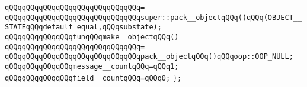 \verb|qQQqqQQqqQQqqQQqqQQqqQQqqQQqqQQq=|\newline
\verb|qQQqqQQqqQQqqQQqqQQqqQQqqQQqqQQqsuper::pack__objectqQQq()qQQq(OBJECT__STATEqQQqdefault_equal,qQQqsubstate);|\newline
\newline
\verb|qQQqqQQqqQQqqQQqfunqQQqmake__objectqQQq()|\newline
\verb|qQQqqQQqqQQqqQQqqQQqqQQqqQQqqQQq=|\newline
\verb|qQQqqQQqqQQqqQQqqQQqqQQqqQQqqQQqpack__objectqQQq()qQQqoop::OOP_NULL;|\newline
\newline
\newline
\verb|qQQqqQQqqQQqqQQqmessage__countqQQq=qQQq1;|\newline
\verb|qQQqqQQqqQQqqQQqfield__countqQQq=qQQq0;|\newline
\verb|};|\newline
\newline

